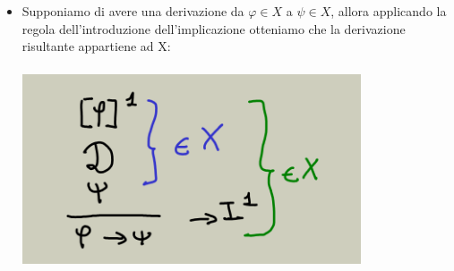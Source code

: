 \documentclass[a4paper,12pt]{report}
\begin{document}
\begin{itemize}
\begin{center}
\end{center}
\item Supponiamo di avere una derivazione da $\varphi \in X$ a $\psi \in X$, allora applicando la regola dell'introduzione dell'implicazione otteniamo che la derivazione risultante appartiene ad X:
\begin{center}
\includegraphics[width=10cm, height=6cm]{def4}
\end{center}
\end{itemize}
\end{document}
